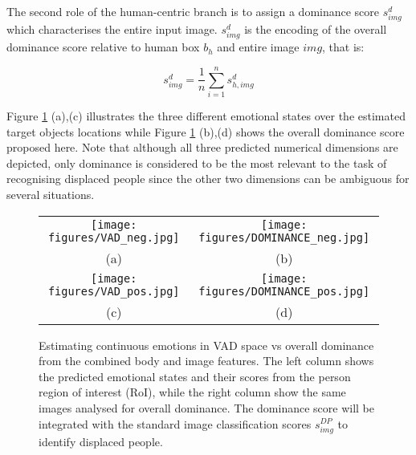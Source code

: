 \documentclass[10pt,twocolumn,letterpaper]{article}
\begin{document}
The second role of the human-centric branch is to assign a dominance score $s_{img}^{d}$ which characterises the entire input image.
$s_{img}^{d}$  is the encoding of the overall dominance score relative to human box $b_h$ and entire image $img$, that is:

\begin{equation} \label{eq:2}
s_{img}^{d} = \frac{1}{n} \sum_{i=1}^{n} s_{h,img}^d  
\end{equation} 

\noindent
Figure \ref{Fig. 3} (a),(c) illustrates the three different emotional states over the estimated target objects locations while Figure \ref{Fig. 3} (b),(d) shows the overall dominance score proposed here. Note that although all three predicted numerical dimensions are depicted, only dominance is considered to be the most relevant to the task of recognising displaced people since the other two dimensions can be ambiguous for several situations.


\begin{figure}[t!]
	\centering
	\begin{tabular}{cc}
		\texttt{[image: figures/VAD\_neg.jpg]} &   \texttt{[image: figures/DOMINANCE\_neg.jpg]} \\
		(a)  & (b)  \\[7pt]
		\texttt{[image: figures/VAD\_pos.jpg]} &   \texttt{[image: figures/DOMINANCE\_pos.jpg]} \\
		(c)  & (d)  \\[7pt]
	\end{tabular}
	\caption{Estimating continuous emotions in VAD space vs overall dominance from the combined body and image features. The left column shows the predicted emotional states and their scores from the person region of interest (RoI), while the right column show the same images analysed for overall dominance. The dominance score will be integrated with the standard image classification scores $s_{img}^{DP}$ to identify displaced people. }
	\label{Fig. 3}
\end{figure}
\end{document}
